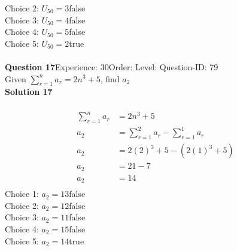 \documentclass{article}
\begin{document}
Choice 2: \hspace{20pt}$U_{50}=3$\hspace{20pt}false\\
Choice 3: \hspace{20pt}$U_{50}=4$\hspace{20pt}false\\
Choice 4: \hspace{20pt}$U_{50}=5$\hspace{20pt}false\\
Choice 5: \hspace{20pt}$U_{50}=2$\hspace{20pt}true\\
\\[4pt]
\noindent\textbf{Question 17}\hspace{20pt}Experience: 30\hspace{20pt}Order: \hspace{20pt}Level: \hspace{20pt}Question-ID: 79\\[2pt]
Given $\displaystyle\sum_{r=1}^{n} a_r = 2n^3+5$, find $a_2$\\[4pt]
\noindent\textbf{Solution 17}\\[2pt]
\\[-35pt]\begin{align*}
\displaystyle\sum_{r=1}^{n} a_r &= 2n^3+5\\[2pt]
a_2&=\displaystyle\sum_{r=1}^{2} a_r - \displaystyle\sum_{r=1}^{1} a_r \\[2pt]
a_2&= 2(2)^3+5- (2(1)^3+5) \\[2pt]
a_2&= 21- 7 \\[2pt]
a_2&= 14 \\[2pt]
\end{align*}
Choice 1: \hspace{20pt}$a_2= 13$\hspace{20pt}false\\
Choice 2: \hspace{20pt}$a_2= 12$\hspace{20pt}false\\
Choice 3: \hspace{20pt}$a_2= 11$\hspace{20pt}false\\
Choice 4: \hspace{20pt}$a_2= 15$\hspace{20pt}false\\
Choice 5: \hspace{20pt}$a_2= 14$\hspace{20pt}true\\
\end{document}
